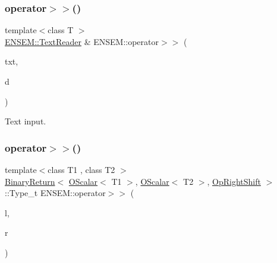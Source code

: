 \mbox{\label{group__obsscalar_ga0ec7538d973fc2e40220fd1ef622f982}} 
\subsubsection{\texorpdfstring{operator$>$$>$()}{operator>>()}\hspace{0.1cm}{\footnotesize\ttfamily [2/3]}}
{\footnotesize\ttfamily template$<$class T $>$ \\
\mbox{\hyperlink{classENSEM_1_1TextReader}{E\+N\+S\+E\+M\+::\+Text\+Reader}} \& E\+N\+S\+E\+M\+::operator$>$$>$ (\begin{DoxyParamCaption}\item[{\mbox{\hyperlink{classENSEM_1_1TextReader}{E\+N\+S\+E\+M\+::\+Text\+Reader}} \&}]{txt,  }\item[{\mbox{\hyperlink{classENSEM_1_1OScalar}{O\+Scalar}}$<$ T $>$ \&}]{d }\end{DoxyParamCaption})\hspace{0.3cm}{\ttfamily [inline]}}



Text input. 

\mbox{\label{group__obsscalar_ga015e8600020030e6443b821a8064e644}} 
\subsubsection{\texorpdfstring{operator$>$$>$()}{operator>>()}\hspace{0.1cm}{\footnotesize\ttfamily [3/3]}}
{\footnotesize\ttfamily template$<$class T1 , class T2 $>$ \\
\mbox{\hyperlink{structENSEM_1_1BinaryReturn}{Binary\+Return}}$<$ \mbox{\hyperlink{classENSEM_1_1OScalar}{O\+Scalar}}$<$ T1 $>$, \mbox{\hyperlink{classENSEM_1_1OScalar}{O\+Scalar}}$<$ T2 $>$, \mbox{\hyperlink{structENSEM_1_1OpRightShift}{Op\+Right\+Shift}} $>$\+::Type\+\_\+t E\+N\+S\+E\+M\+::operator$>$$>$ (\begin{DoxyParamCaption}\item[{const \mbox{\hyperlink{classENSEM_1_1OScalar}{O\+Scalar}}$<$ T1 $>$ \&}]{l,  }\item[{const \mbox{\hyperlink{classENSEM_1_1OScalar}{O\+Scalar}}$<$ T2 $>$ \&}]{r }\end{DoxyParamCaption})\hspace{0.3cm}{\ttfamily [inline]}}


